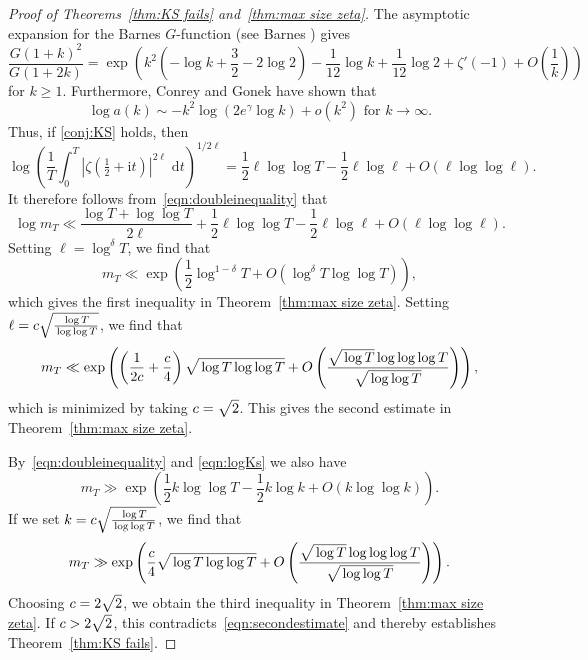 \documentclass[10pt,reqno,twoside]{amsart}
\renewcommand{\d}{{\mathrm{d}}} %
\renewcommand{\i}{{\mathrm{i}}} %
\numberwithin{equation}{section}
\numberwithin{theorem}{section}
\begin{document}
{{\begin{proof}[Proof of Theorems~\ref{thm:KS fails} and~\ref{thm:max size zeta}]
The asymptotic expansion for the Barnes $G$-function (see Barnes
\cite{Bar})  gives
\begin{equation}\label{eq:G asy}
\frac{G(1+k)^2}{G(1+2k)} = \exp\left(k^2\left(-\log k +
\frac{3}{2} - 2\log 2\right) - \frac{1}{12} \log k  + \frac{1}{12}
\log 2 + \zeta'(-1) + O\left(\frac{1}{k}\right) \right)
\end{equation}
for $k\geq 1$.
Furthermore, Conrey and Gonek \cite{ConGon} have shown that
\begin{equation}\label{eq:a asy}
\log a(k) \sim -k^2\log(2e^\gamma\log k) + o(k^2) \textrm{ for } k
\rightarrow \infty .
\end{equation}
Thus, if  \eqref{conj:KS} holds, then
\begin{equation}
\label{eqn:logKs}
\log  \left(\frac{1}{T} \int_0^T
|\zeta(\tfrac12+\i t)|^{2\ell} \;\d t \right)^{1/2\ell}
=
\frac12 \ell \log\log T
-\frac{1}{2} \ell \log \ell +O( \ell \log\log \ell) .
\end{equation}
It therefore follows from~\eqref{eqn:doubleinequality} that
\begin{equation}\label{eq:320}
\log m_T \ll
\frac{\log T+\log\log T}{2\ell} +\frac12 \ell \log\log T
-\frac{1}{2} \ell \log \ell +O( \ell \log\log \ell) .
\end{equation}
Setting $\ell=\log^\delta T$, we find that
\begin{equation}
m_T \ll \exp\left(\frac{1}{2} \log^{1-\delta} T +O(\log^\delta T\log\log T)
\right),
\end{equation}
which gives the first inequality in Theorem~\ref{thm:max size zeta}.
Setting $\ell=c \sqrt{\frac{\mathstrut \log T}
{ \mathstrut \log\log T}}$, we find that
\begin{equation}\label{eqn:secondestimate}
m_T \ll \exp\left(\left(\frac{1}{2c} +
\frac{c}{4}\right)\sqrt{\mathstrut \log T \log\log T} +
O\left(\frac{\sqrt{\mathstrut \log T} \log\log\log T}{\sqrt{\mathstrut \log\log
T}}\right)\right),
\end{equation}
which is minimized by taking $c=\sqrt{\mathstrut 2}$.  This gives the second estimate
in Theorem~\ref{thm:max size zeta}.

By~\eqref{eqn:doubleinequality} and
\eqref{eqn:logKs}
we also have
\begin{equation}
m_T\gg \exp\left(\frac12 k \log\log T - \frac12 k \log k + O(k\log\log k) \right).
\end{equation}
If we set $k=c \sqrt{\frac{\mathstrut \log T}
{ \mathstrut \log\log T}}$,
we find that
\begin{equation}
m_T\gg \exp\left( \frac{c}{4}\sqrt{\mathstrut \log T \log\log T}
+ O\left(\frac{\sqrt{\mathstrut \log T} \log\log\log T}{\sqrt{\mathstrut
\log\log T}}\right)\right).
\end{equation}
Choosing $c=2\sqrt{\mathstrut 2}$, we obtain the third inequality
 in Theorem~\ref{thm:max size zeta}.
If $c>2\sqrt{\mathstrut 2}$,  this contradicts~\eqref{eqn:secondestimate}
and  thereby establishes
Theorem~\ref{thm:KS fails}.
\end{proof}


}}
\end{document}
